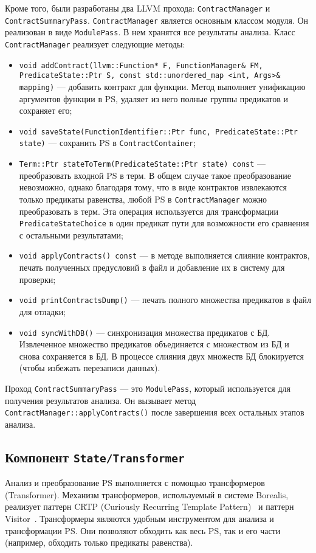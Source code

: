 Кроме того, были разработаны два LLVM прохода: \texttt{ContractManager} и \texttt{ContractSummaryPass}. \texttt{ContractManager} является основным классом модуля. Он реализован в виде \texttt{ModulePass}. В нем хранятся все результаты анализа. Класс \texttt{ContractManager} реализует следующие методы:
\begin{itemize}
\item \texttt{void addContract(llvm::Function* F, FunctionManager\& FM, PredicateState::Ptr S, const std::unordered_map <int, Args>\& mapping)} --- добавить контракт для функции. Метод выполняет унификацию аргументов функции в PS, удаляет из него полные группы предикатов и сохраняет его;
\item \texttt{void saveState(FunctionIdentifier::Ptr func, PredicateState::Ptr state)} --- сохранить PS в \texttt{ContractContainer};
\item \texttt{Term::Ptr stateToTerm(PredicateState::Ptr state) const} --- преобразовать входной PS в терм. В общем случае такое преобразование невозможно, однако благодаря тому, что в виде контрактов извлекаются только предикаты равенства, любой PS в \texttt{ContractManager} можно преобразовать в терм. Эта операция используется для трансформации \texttt{PredicateStateChoice} в один предикат пути для возможности его сравнения с остальными результатами;
\item \texttt{void applyContracts() const} --- в методе выполняется слияние контрактов, печать полученных предусловий в файл и добавление их в систему для проверки;
\item \texttt{void printContractsDump()} --- печать полного множества предикатов в файл для отладки;
\item \texttt{void syncWithDB()} --- синхронизация множества предикатов с БД. Извлеченное множество предикатов объединяется с множеством из БД и снова сохраняется в БД. В процессе слияния двух множеств БД блокируется (чтобы избежать перезаписи данных).
\end{itemize}

Проход \texttt{ContractSummaryPass} --- это \texttt{ModulePass}, который используется для получения результатов анализа. Он вызывает метод \texttt{ContractManager::applyContracts()} после завершения всех остальных этапов анализа.

\subsection{Компонент \texttt{State/Transformer}}
Анализ и преобразование PS выполняется с помощью трансформеров (Transformer). Механизм трансформеров, используемый в системе Borealis, реализует паттерн CRTP (Curiously Recurring Template Pattern)~\cite{crtp} и паттерн Visitor~\cite{patterns}. Трансформеры являются удобным инструментом для анализа и трансформации PS. Они позволяют обходить как весь PS, так и его части (например, обходить только предикаты равенства).

